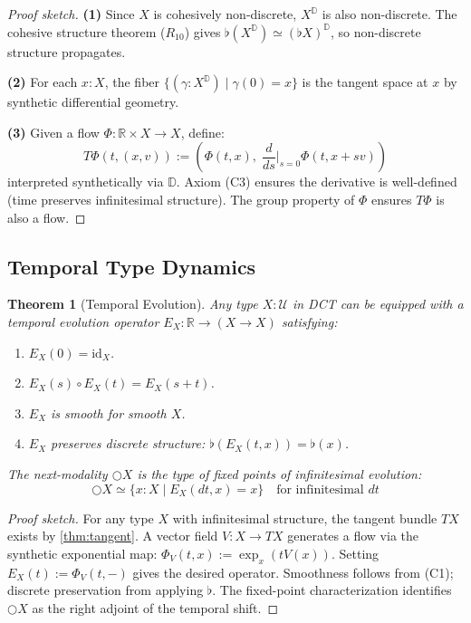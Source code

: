 \documentclass[11pt,a4paper]{article}
\theoremstyle{plain}
\newtheorem{theorem}{Theorem}[section]
\theoremstyle{definition}
\theoremstyle{remark}
\newcommand{\R}{\mathbb{R}}
\newcommand{\D}{\mathbb{D}}
\newcommand{\U}{\mathcal{U}}
\begin{document}
\begin{proof}[Proof sketch]
\textbf{(1)} Since $X$ is cohesively non-discrete, $X^{\D}$ is also non-discrete.
The cohesive structure theorem ($R_{10}$) gives $\flat(X^{\D}) \simeq (\flat X)^{\D}$, so non-discrete structure propagates.

\textbf{(2)} For each $x : X$, the fiber $\{(\gamma : X^{\D}) \mid \gamma(0) = x\}$ is the tangent space at $x$ by synthetic differential geometry.

\textbf{(3)} Given a flow $\Phi : \R \times X \to X$, define:
\begin{equation}
    T\Phi(t, (x, v)) := \left(\Phi(t, x),\; \frac{d}{ds}\Big|_{s=0} \Phi(t, x + sv)\right)
\end{equation}
interpreted synthetically via $\D$.
Axiom (C3) ensures the derivative is well-defined (time preserves infinitesimal structure).
The group property of $\Phi$ ensures $T\Phi$ is also a flow.
\end{proof}

\subsection{Temporal Type Dynamics}

\begin{theorem}[Temporal Evolution]
\label{thm:temporal}
Any type $X : \U$ in DCT can be equipped with a temporal evolution operator $E_X : \R \to (X \to X)$ satisfying:
\begin{enumerate}[nosep]
    \item $E_X(0) = \mathrm{id}_X$.
    \item $E_X(s) \circ E_X(t) = E_X(s + t)$.
    \item $E_X$ is smooth for smooth $X$.
    \item $E_X$ preserves discrete structure: $\flat(E_X(t, x)) = \flat(x)$.
\end{enumerate}
The next-modality $\bigcirc X$ is the type of fixed points of infinitesimal evolution:
\begin{equation}
    \bigcirc X \simeq \{x : X \mid E_X(dt, x) = x\} \quad \text{for infinitesimal } dt
\end{equation}
\end{theorem}

\begin{proof}[Proof sketch]
For any type $X$ with infinitesimal structure, the tangent bundle $TX$ exists by \cref{thm:tangent}.
A vector field $V : X \to TX$ generates a flow via the synthetic exponential map: $\Phi_V(t, x) := \exp_x(tV(x))$.
Setting $E_X(t) := \Phi_V(t, -)$ gives the desired operator.
Smoothness follows from (C1); discrete preservation from applying $\flat$.
The fixed-point characterization identifies $\bigcirc X$ as the right adjoint of the temporal shift.
\end{proof}
\end{document}
